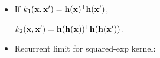 \documentclass[portrait,a0b,final,a4resizeable]{include/a0poster}
\begin{document}
\begin{poster}
\begin{multicols}{2}

\newcommand{\feat}{\vh}

\begin{minipage}[c]{0.5\columnwidth}

\begin{itemize}
\item If ${k_1(\vx, \vx') = \feat(\vx) \tra \feat(\vx')}$,

 ${k_2(\vx, \vx') = \feat(\feat(\vx)) \tra \feat(\feat(\vx'))}$.
%

\item Recurrent limit for squared-exp kernel: %
%
%
%
%
%


\end{itemize}
\end{minipage}
\end{multicols}
\end{poster}
\end{document}
